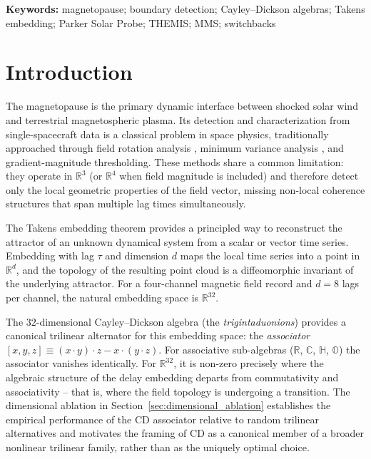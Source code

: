 \documentclass[draft]{agujournal2025}
\let\citep\cite%
\begin{document}
\textbf{Keywords:} magnetopause; boundary detection; Cayley--Dickson algebras;
Takens embedding; Parker Solar Probe; THEMIS; MMS; switchbacks

\clearpage

\section{Introduction}
\label{sec:intro}

The magnetopause is the primary dynamic interface between shocked solar wind
and terrestrial magnetospheric plasma.  Its detection and characterization from
single-spacecraft data is a classical problem in space physics, traditionally
approached through field rotation analysis \citep{paschmann1993}, minimum
variance analysis \citep{haaland2004}, and gradient-magnitude thresholding.
These methods share a common limitation: they operate in $\mathbb{R}^3$ (or
$\mathbb{R}^4$ when field magnitude is included) and therefore detect only the
local geometric properties of the field vector, missing non-local coherence
structures that span multiple lag times simultaneously.

The Takens embedding theorem \citep{packard1980,takens1981} provides a principled way to
reconstruct the attractor of an unknown dynamical system from a scalar or
vector time series.  Embedding with lag $\tau$ and dimension $d$ maps the
local time series into a point in $\mathbb{R}^d$, and the topology of the
resulting point cloud is a diffeomorphic invariant of the underlying attractor.
For a four-channel magnetic field record and $d=8$ lags per channel, the
natural embedding space is $\mathbb{R}^{32}$.

The $32$-dimensional Cayley--Dickson algebra (the \emph{trigintaduonions}) provides
a canonical trilinear alternator for this embedding space: the \emph{associator}
$[x,y,z] \equiv (x \cdot y) \cdot z - x \cdot (y \cdot z)$.
For associative sub-algebras ($\mathbb{R}$, $\mathbb{C}$, $\mathbb{H}$, $\mathbb{O}$)
the associator vanishes identically.  For $\mathbb{R}^{32}$, it is non-zero
precisely where the algebraic structure of the delay embedding departs from
commutativity and associativity -- that is, where the field topology is
undergoing a transition.
The dimensional ablation in Section~\ref{sec:dimensional_ablation} establishes
the empirical performance of the CD associator relative to random trilinear
alternatives and motivates the framing of CD as a canonical member of a
broader nonlinear trilinear family, rather than as the uniquely optimal choice.
\end{document}

